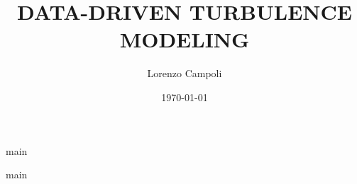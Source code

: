 \documentclass{article}
\title{DATA-DRIVEN TURBULENCE MODELING}
\author{Lorenzo Campoli}
\date{\today}
\begin{document}
\maketitle

\makenomenclature

\printnomenclature[3cm]

\tableofcontents

\listoffigures

\listoftables


\newpage
{main}

\newpage
{main}

%
%
%
%
%
%
%
%
\end{document}
